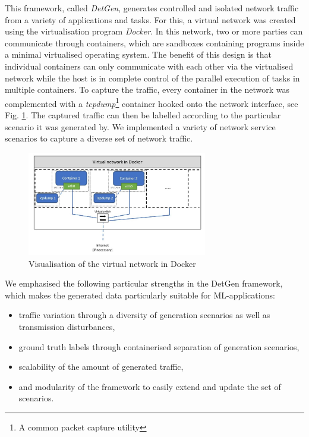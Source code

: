 \documentclass[a4paper,12pt,twoside]{article}
\begin{document}

This framework, called \textit{DetGen}, generates controlled and isolated network traffic from a variety of applications and tasks. For this, a virtual network was created using the virtualisation program \textit{Docker}. In this network, two or more parties can communicate through containers,  which are sandboxes containing programs inside a minimal virtualised operating system. The benefit of this design is that individual containers can only communicate with each other via the virtualised network while the host is in complete control of the parallel execution of tasks in multiple containers. To capture the traffic, every container in the network was complemented with a \textit{tcpdump}\footnote{A common packet capture utility} container hooked onto the network interface, see Fig. \ref{docker}. The captured traffic can then be labelled according to the particular scenario it was generated by. We implemented a variety of network service  scenarios to capture a diverse set of network traffic.

\begin{figure}
\centering
\includegraphics[width=0.7\textwidth]{images/Dockernet.jpg}
\caption{Visualisation of the virtual network in Docker}\label{docker}
\end{figure}


We emphasised the following particular strengths in the DetGen framework, which makes the generated data particularly suitable for ML-applications:
\begin{itemize}
\item traffic variation through a diversity of generation scenarios as well as transmission disturbances,
\item ground truth labels through containerised separation of generation scenarios,
\item scalability of the amount of generated traffic,
\item and modularity of the framework to easily extend and update the set of scenarios.
\end{itemize}
\end{document}
